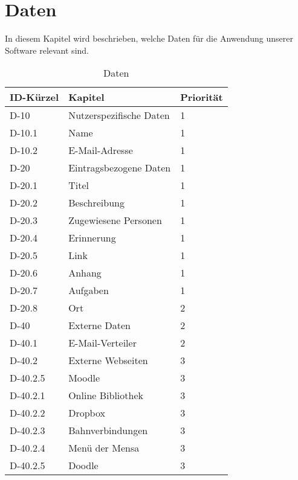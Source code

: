 
\chapter{Daten}

In diesem Kapitel wird beschrieben, welche Daten für die Anwendung unserer Software relevant sind.\\

\begin{table}[H]
    \caption{Daten}
    \label{einleitung:kapitel}
    \begin{tabularx}{\textwidth}{|l|X|l|}
        \toprule
        \textbf{ID-Kürzel} & \textbf{Kapitel} & \textbf{Priorität}\\
        \endhead
        \hline
        D-10 & Nutzerspezifische Daten & 1\\
        D-10.1 & Name &1\\
        D-10.2 & E-Mail-Adresse &1 \\       
        \hline
        D-20 & Eintragsbezogene Daten & 1\\
        D-20.1 & Titel &1\\
        D-20.2 & Beschreibung & 1\\
        D-20.3 & Zugewiesene Personen & 1\\
        D-20.4 & Erinnerung &1\\
        D-20.5 & Link &1\\
        D-20.6 & Anhang &1\\
        D-20.7 & Aufgaben & 1\\
        D-20.8 & Ort &  2\\
        \hline
        D-40 & Externe Daten & 2\\
        D-40.1 & E-Mail-Verteiler & 2\\
        D-40.2 & Externe Webseiten & 3 \\
        D-40.2.5 & Moodle & 3\\        
        D-40.2.1 & Online Bibliothek & 3\\
        D-40.2.2 & Dropbox & 3 \\
        D-40.2.3 & Bahnverbindungen & 3\\
        D-40.2.4 & Menü der Mensa & 3\\
        D-40.2.5 & Doodle & 3\\        
        \hline
    \end{tabularx}
\end{table}


